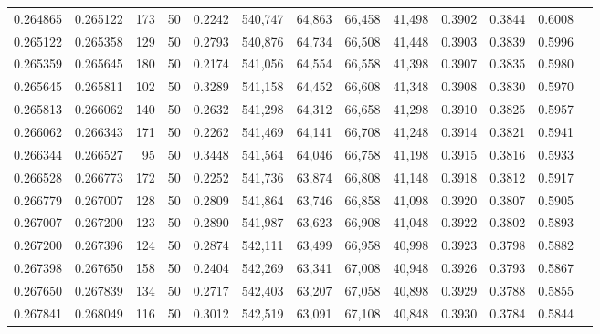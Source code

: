 \begin{tabular}{rrrrrrrrrrrrr}
0.264865 & 0.265122 &   173 &  50 &                                     0.2242 & 540,747 &  64,863 &  66,458 &  41,498 & 0.3902 & 0.3844 & 0.6008 \\
0.265122 & 0.265358 &   129 &  50 &                                     0.2793 & 540,876 &  64,734 &  66,508 &  41,448 & 0.3903 & 0.3839 & 0.5996 \\
0.265359 & 0.265645 &   180 &  50 &                                     0.2174 & 541,056 &  64,554 &  66,558 &  41,398 & 0.3907 & 0.3835 & 0.5980 \\
0.265645 & 0.265811 &   102 &  50 &                                     0.3289 & 541,158 &  64,452 &  66,608 &  41,348 & 0.3908 & 0.3830 & 0.5970 \\
0.265813 & 0.266062 &   140 &  50 &                                     0.2632 & 541,298 &  64,312 &  66,658 &  41,298 & 0.3910 & 0.3825 & 0.5957 \\
0.266062 & 0.266343 &   171 &  50 &                                     0.2262 & 541,469 &  64,141 &  66,708 &  41,248 & 0.3914 & 0.3821 & 0.5941 \\
0.266344 & 0.266527 &    95 &  50 &                                     0.3448 & 541,564 &  64,046 &  66,758 &  41,198 & 0.3915 & 0.3816 & 0.5933 \\
0.266528 & 0.266773 &   172 &  50 &                                     0.2252 & 541,736 &  63,874 &  66,808 &  41,148 & 0.3918 & 0.3812 & 0.5917 \\
0.266779 & 0.267007 &   128 &  50 &                                     0.2809 & 541,864 &  63,746 &  66,858 &  41,098 & 0.3920 & 0.3807 & 0.5905 \\
0.267007 & 0.267200 &   123 &  50 &                                     0.2890 & 541,987 &  63,623 &  66,908 &  41,048 & 0.3922 & 0.3802 & 0.5893 \\
0.267200 & 0.267396 &   124 &  50 &                                     0.2874 & 542,111 &  63,499 &  66,958 &  40,998 & 0.3923 & 0.3798 & 0.5882 \\
0.267398 & 0.267650 &   158 &  50 &                                     0.2404 & 542,269 &  63,341 &  67,008 &  40,948 & 0.3926 & 0.3793 & 0.5867 \\
0.267650 & 0.267839 &   134 &  50 &                                     0.2717 & 542,403 &  63,207 &  67,058 &  40,898 & 0.3929 & 0.3788 & 0.5855 \\
0.267841 & 0.268049 &   116 &  50 &                                     0.3012 & 542,519 &  63,091 &  67,108 &  40,848 & 0.3930 & 0.3784 & 0.5844 \\

\end{tabular}
